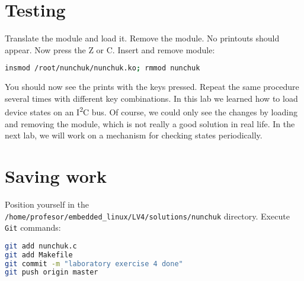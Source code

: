 \documentclass[11pt]{article}
\begin{document}
\section{Testing}
Translate the module and load it. Remove the module. No printouts should appear.
Now press the Z or C. Insert and remove module:
\begin{lstlisting}[language=bash]
insmod /root/nunchuk/nunchuk.ko; rmmod nunchuk
\end{lstlisting}
You should now see the prints with the keys pressed. Repeat the same procedure
several times with different key combinations.
\newline
\newline
In this lab we learned how to load device states on an I\textsuperscript{2}C
bus. Of course, we could only see the changes by loading and removing the
module, which is not really a good solution in real life. In the next lab, we
will work on a mechanism for checking states periodically.

\section{Saving work}
Position yourself in the
\texttt{/home/profesor/embedded\_linux/LV4/solutions/nunchuk} directory.
Execute \texttt{Git} commands:
\begin{lstlisting}[language=bash]
git add nunchuk.c
git add Makefile
git commit -m "laboratory exercise 4 done"
git push origin master
\end{lstlisting}
\end{document}
